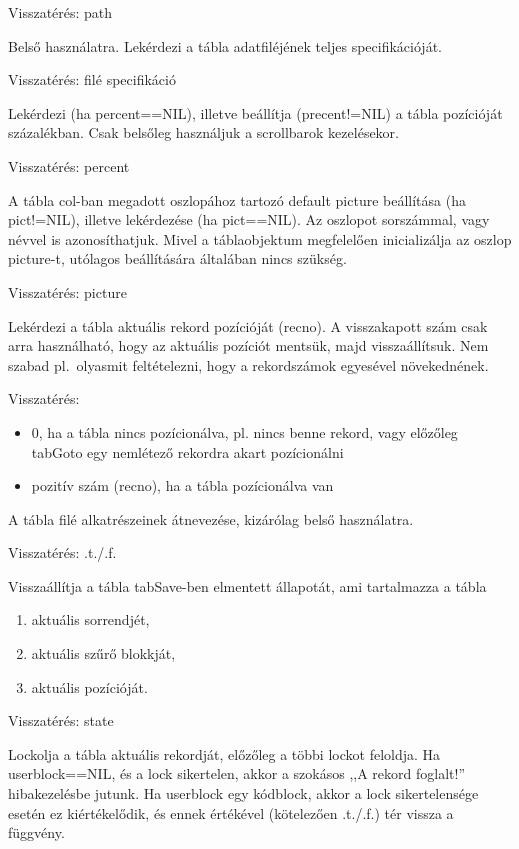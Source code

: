 Visszatérés: path
 

Belső használatra. 
Lekérdezi a tábla adatfiléjének teljes specifikációját.

Visszatérés: filé specifikáció

Lekérdezi (ha percent==NIL), illetve beállítja (precent!=NIL)
a tábla pozícióját százalékban. Csak belsőleg használjuk 
a scrollbarok kezelésekor.

Visszatérés: percent
 

A tábla col-ban megadott oszlopához tartozó default
picture beállítása (ha pict!=NIL), 
illetve lekérdezése (ha pict==NIL). 
Az oszlopot sorszámmal, vagy névvel is azonosíthatjuk.
Mivel a táblaobjektum megfelelően inicializálja az oszlop
picture-t, utólagos beállítására általában nincs szükség.

Visszatérés: picture


Lekérdezi a tábla aktuális rekord pozícióját (recno).
A visszakapott szám csak arra használható,
hogy az aktuális pozíciót mentsük, majd visszaállítsuk.
Nem szabad pl.\ olyasmit feltételezni, hogy a rekordszámok
egyesével növekednének.

Visszatérés:
\begin{itemize}
\item 0, ha a tábla nincs pozícionálva, pl. nincs benne rekord,
         vagy előzőleg tabGoto egy nemlétező rekordra akart pozícionálni
\item pozitív szám (recno), ha a tábla pozícionálva van
\end{itemize}


A tábla filé alkatrészeinek átnevezése, kizárólag belső
használatra.

Visszatérés: .t./.f.



Visszaállítja a tábla tabSave-ben elmentett
állapotát, ami tartalmazza a tábla
\begin{enumerate}
\item aktuális sorrendjét,
\item aktuális szűrő blokkját,
\item aktuális pozícióját.
\end{enumerate}

Visszatérés: state


Lockolja a tábla aktuális rekordját, előzőleg a többi lockot
feloldja. Ha userblock==NIL, és a lock sikertelen, akkor a
szokásos ,,A rekord foglalt!'' hibakezelésbe jutunk.
Ha userblock egy kódblock, akkor a lock sikertelensége esetén
ez kiértékelődik, és ennek értékével (kötelezően .t./.f.) tér 
vissza a függvény.

